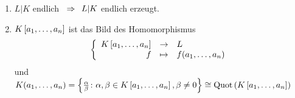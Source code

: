 
\begin{bemerkung}
    \begin{enumerate}[leftmargin=*, label=(\alph*)]
        \item $L | K$ endlich $\enskip \Rightarrow \enskip L | K$ endlich erzeugt.
        \item $\polynom[K][a_1, \dots, a_n]$ ist das Bild des Homomorphismus
        \begin{align*}
            \bigabbnoname{\polynom[K][a_1, \dots, a_n]}{L}{f}{f(a_1, \dots, a_n)}
        \end{align*}
        und $K(a_1, \dots , a_n) = \menge{\frac{\alpha}{\beta} \colon \alpha, \beta \in \polynom[K][a_1, \dots, a_n], \beta \neq 0} \isomorph \Quot\left( \polynom[K][a_1, \dots, a_n] \right)$
    \end{enumerate}
\end{bemerkung}

